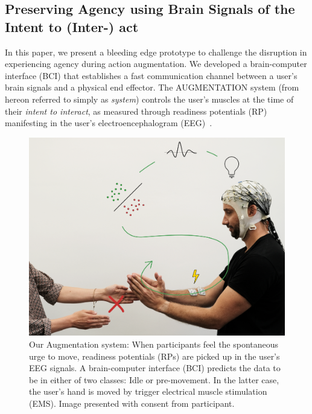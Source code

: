 
\subsection{Preserving Agency using Brain Signals of the Intent to (Inter-) act}
In this paper, we present a bleeding edge prototype to challenge the disruption in experiencing agency during action augmentation. We developed a brain-computer interface (BCI) that establishes a fast communication channel between a user's brain signals and a physical end effector. The AUGMENTATION system (from hereon referred to simply as \textit{system}) controls the user's muscles at the time of their \textit{intent to interact}, as measured through readiness potentials (RP) manifesting in the user's electroencephalogram (EEG)~\cite{Nguyen2023-me, Schurger2021-vp, Schultze-Kraft2016-bx, Schultze-Kraft2021-cu}. 

\begin{figure}[!h]
    \centering
    \includegraphics[width=\columnwidth]{figures/bci_game.png}
    \caption{Our Augmentation system: When participants feel the spontaneous urge to move, readiness potentials (RPs) are picked up in the user's EEG signals. A brain-computer interface (BCI) predicts the data to be in either of two classes: Idle or pre-movement. In the latter case, the user's hand is moved by trigger electrical muscle stimulation (EMS). Image presented with consent from participant.}
\end{figure}

